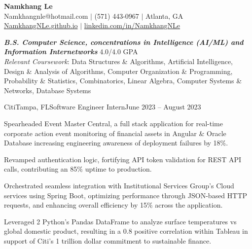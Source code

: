 \documentclass{article}
\begin{document}
\thispagestyle{empty}

\begin{center}
    \textbf{\LARGE Namkhang Le} \\
    Namkhangnle@hotmail.com $|$ (571) 443-0967 $|$ Atlanta, GA \\
    \href{https://namkhangnle.github.io/}{NamkhangNLe.github.io} $|$ \href{https://www.linkedin.com/in/namkhangnle/}{linkedin.com/in/NamkhangNLe}
\end{center}

\begin{flushleft}


{\textbf{\textit{B.S. Computer Science, concentrations in Intelligence (AI/ML) and Information Internetworks}} \hfill 4.0/4.0 GPA \\ \textit{Relevant Coursework}: Data Structures \& Algorithms, Artificial Intelligence, Design \& Analysis of Algorithms, Computer Organization \& Programming, Probability \& Statistics, Combinatorics, Linear Algebra, Computer Systems \& Networks, Database Systems }


    \begin{experience}{Citi}{Tampa, FL}{Software Engineer Intern}{June 2023 -- August 2023}
        \item Spearheaded Event Master Central, a full stack application for real-time corporate action event monitoring of financial assets in Angular \& Oracle Database increasing engineering awareness of deployment failures by 18\%.
        \item Revamped authentication logic, fortifying API token validation for REST API calls, contributing an 85\% uptime to production.
        \item Orchestrated seamless integration with Institutional Services Group's Cloud services using Spring Boot, optimizing performance through JSON-based HTTP requests, and enhancing overall efficiency by 15\% across the application.
        \item Leveraged 2 Python’s Pandas DataFrame to analyze surface temperatures vs global domestic product, resulting in a 0.8 positive correlation within Tableau in support of Citi's 1 trillion dollar commitment to sustainable finance.
    \end{experience}


\end{flushleft}
\end{document}

